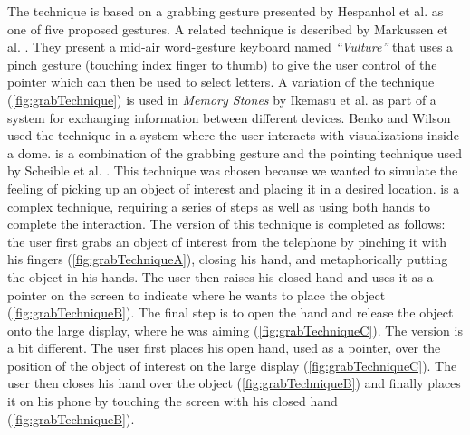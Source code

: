 The \grab technique is based on a grabbing gesture presented by Hespanhol et al. \cite{Hespanhol:2012} as one of five proposed gestures.
A related technique is described by Markussen et al. \cite{Markussen:2014}. 
They present a mid-air word-gesture keyboard named \emph{``Vulture''} that uses a pinch gesture (touching index finger to thumb) to give the user control of the pointer which can then be used to select letters.
A variation of the \grab technique (\cref{fig:grabTechnique}) is used in \emph{Memory Stones} \cite{Ikematsu:2015} by Ikemasu et al. as part of a system for exchanging information between different devices. Benko and Wilson \cite{Benko:2010} used the \grab technique in a system where the user interacts with visualizations inside a dome. \grab is a combination of the grabbing gesture and the pointing technique used by Scheible et al. \cite{Scheible:2008}.
This technique was chosen because we wanted to simulate the feeling of picking up an object of interest and placing it in a desired location.
\grab is a complex technique, requiring a series of steps as well as using both hands to complete the interaction.
The \push version of this technique is completed as follows: the user first grabs an object of interest from the telephone by pinching it with his fingers (\cref{fig:grabTechniqueA}), closing his hand, and metaphorically putting the object in his hands.
The user then raises his closed hand and uses it as a pointer on the screen to indicate where he wants to place the object (\cref{fig:grabTechniqueB}).
The final step is to open the hand and release the object onto the large display, where he was aiming (\cref{fig:grabTechniqueC}).
The \pull version is a bit different.
The user first places his open hand, used as a pointer, over the position of the object of interest on the large display (\cref{fig:grabTechniqueC}).
The user then closes his hand over the object (\cref{fig:grabTechniqueB}) and finally places it on his phone by touching the screen with his closed hand (\cref{fig:grabTechniqueB}).  

